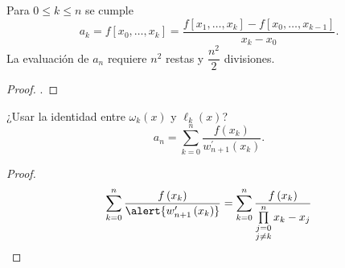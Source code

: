 \begin{frame}
	\begin{theorem}
		Para $0\leq k\leq n$ se cumple
		\begin{equation*}
			a_{k}=
			f\left[x_{0},\ldots,x_{k}\right]=
			\dfrac{
			f\left[x_{1},\ldots,x_{k}\right]-
			f\left[x_{0},\ldots,x_{k-1}\right]
			}{x_{k}-x_{0}}.
		\end{equation*}
		La evaluación de $a_{n}$ requiere $n^{2}$ restas y
		$\dfrac{n^{2}}{2}$ divisiones.
	\end{theorem}

	\begin{proof}
		.
	\end{proof}

	\begin{theorem}
		¿Usar la identidad entre $\omega_{k}\left(x\right)$ y
		$\ell_{k}\left(x\right)$?
		\begin{equation*}
			a_{n}=
			\sum\limits_{k=0}^{n}
			\dfrac{
				f\left(x_{k}\right)
			}{
				w^{\prime}_{n+1}
				\left(x_{k}\right)
			}.
		\end{equation*}
	\end{theorem}

	\begin{proof}
		\begin{equation*}
			\sum\limits_{k=0}^{n}
			\dfrac{
				f\left(x_{k}\right)
			}{
				\alert{
					w^{\prime}_{n+1}
					\left(x_{k}\right)
				}
			}=
			\sum\limits_{k=0}^{n}
			\dfrac{
			f\left(x_{k}\right)
			}{
			\prod\limits_{\substack{j=0 \\j\neq k}}^{n}
			x_{k}-x_{j}
			}
		\end{equation*}
	\end{proof}

\end{frame}

